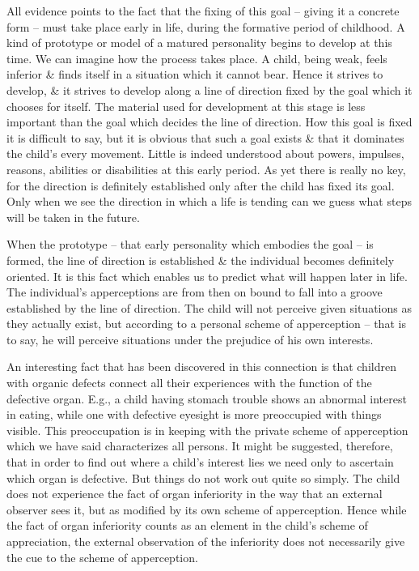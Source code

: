 \documentclass{article}
\numberwithin{equation}{section}
\begin{document}
All evidence points to the fact that the fixing of this goal -- giving it a concrete form -- must take place early in life, during the formative period of childhood. A kind of prototype or model of a matured personality begins to develop at this time. We can imagine how the process takes place. A child, being weak, feels inferior \& finds itself in a situation which it cannot bear. Hence it strives to develop, \& it strives to develop along a line of direction fixed by the goal which it chooses for itself. The material used for development at this stage is less important than the goal which decides the line of direction. How this goal is fixed it is difficult to say, but it is obvious that such a goal exists \& that it dominates the child's every movement. Little is indeed understood about powers, impulses, reasons, abilities or disabilities at this early period. As yet there is really no key, for the direction is definitely established only after the child has fixed its goal. Only when we see the direction in which a life is tending can we guess what steps will be taken in the future.

When the prototype -- that early personality which embodies the goal -- is formed, the line of direction is established \& the individual becomes definitely oriented. It is this fact which enables us to predict what will happen later in life. The individual's apperceptions are from then on bound to fall into a groove established by the line of direction. The child will not perceive given situations as they actually exist, but according to a personal scheme of apperception -- that is to say, he will perceive situations under the prejudice of his own interests.

An interesting fact that has been discovered in this connection is that children with organic defects connect all their experiences with the function of the defective organ. E.g., a child having stomach trouble shows an abnormal interest in eating, while one with defective eyesight is more preoccupied with things visible. This preoccupation is in keeping with the private scheme of apperception which we have said characterizes all persons. It might be suggested, therefore, that in order to find out where a child's interest lies we need only to ascertain which organ is defective. But things do not work out quite so simply. The child does not experience the fact of organ inferiority in the way that an external observer sees it, but as modified by its own scheme of apperception. Hence while the fact of organ inferiority counts as an element in the child's scheme of appreciation, the external observation of the inferiority does not necessarily give the cue to the scheme of apperception.
\end{document}
